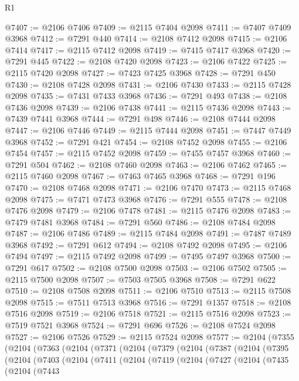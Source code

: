 \begin{lexlean}{R1}
\begin{coremodule}
@7407 := @2106 @7406
@7409 := @2115 @7404 @2098
@7411 := @7407 @7409 @3968
@7412 := @7291 @440
@7414 := @2108 @7412 @2098
@7415 := @2106 @7414
@7417 := @2115 @7412 @2098
@7419 := @7415 @7417 @3968
@7420 := @7291 @445
@7422 := @2108 @7420 @2098
@7423 := @2106 @7422
@7425 := @2115 @7420 @2098
@7427 := @7423 @7425 @3968
@7428 := @7291 @450
@7430 := @2108 @7428 @2098
@7431 := @2106 @7430
@7433 := @2115 @7428 @2098
@7435 := @7431 @7433 @3968
@7436 := @7291 @493
@7438 := @2108 @7436 @2098
@7439 := @2106 @7438
@7441 := @2115 @7436 @2098
@7443 := @7439 @7441 @3968
@7444 := @7291 @498
@7446 := @2108 @7444 @2098
@7447 := @2106 @7446
@7449 := @2115 @7444 @2098
@7451 := @7447 @7449 @3968
@7452 := @7291 @421
@7454 := @2108 @7452 @2098
@7455 := @2106 @7454
@7457 := @2115 @7452 @2098
@7459 := @7455 @7457 @3968
@7460 := @7291 @504
@7462 := @2108 @7460 @2098
@7463 := @2106 @7462
@7465 := @2115 @7460 @2098
@7467 := @7463 @7465 @3968
@7468 := @7291 @196
@7470 := @2108 @7468 @2098
@7471 := @2106 @7470
@7473 := @2115 @7468 @2098
@7475 := @7471 @7473 @3968
@7476 := @7291 @555
@7478 := @2108 @7476 @2098
@7479 := @2106 @7478
@7481 := @2115 @7476 @2098
@7483 := @7479 @7481 @3968
@7484 := @7291 @560
@7486 := @2108 @7484 @2098
@7487 := @2106 @7486
@7489 := @2115 @7484 @2098
@7491 := @7487 @7489 @3968
@7492 := @7291 @612
@7494 := @2108 @7492 @2098
@7495 := @2106 @7494
@7497 := @2115 @7492 @2098
@7499 := @7495 @7497 @3968
@7500 := @7291 @617
@7502 := @2108 @7500 @2098
@7503 := @2106 @7502
@7505 := @2115 @7500 @2098
@7507 := @7503 @7505 @3968
@7508 := @7291 @622
@7510 := @2108 @7508 @2098
@7511 := @2106 @7510
@7513 := @2115 @7508 @2098
@7515 := @7511 @7513 @3968
@7516 := @7291 @1357
@7518 := @2108 @7516 @2098
@7519 := @2106 @7518
@7521 := @2115 @7516 @2098
@7523 := @7519 @7521 @3968
@7524 := @7291 @696
@7526 := @2108 @7524 @2098
@7527 := @2106 @7526
@7529 := @2115 @7524 @2098
@7577 := @2104
    (@7355
      (@2104
        (@7363
          (@2104
            (@7371
              (@2104
                (@7379
                  (@2104
                    (@7387
                      (@2104
                        (@7395
                          (@2104
                            (@7403
                              (@2104
                                (@7411
                                  (@2104
                                    (@7419
                                      (@2104
                                        (@7427
                                          (@2104
                                            (@7435
                                              (@2104
                                                (@7443

\end{coremodule}
\end{lexlean}
